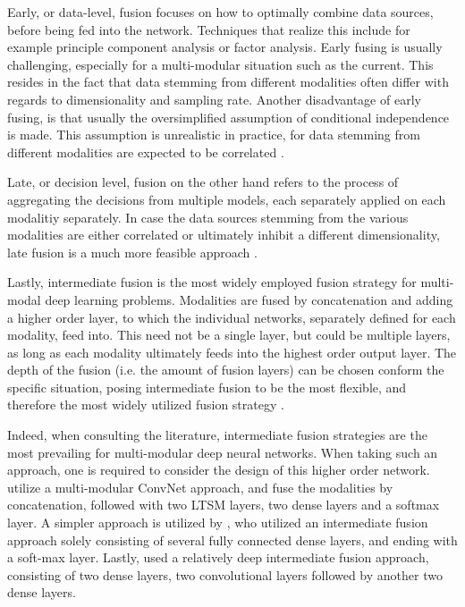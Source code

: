 \documentclass[12pt]{article}
\begin{document}
Early, or data-level, fusion focuses on how to optimally combine data sources, before being fed into the network. Techniques that realize this include for example principle component analysis or factor analysis. Early fusing is usually challenging, especially for a multi-modular situation such as the current. This resides in the fact that data stemming from different modalities often differ with regards to dimensionality and sampling rate. Another disadvantage of early fusing, is that usually the oversimplified assumption of conditional independence is made. This assumption is unrealistic in practice, for data stemming from different modalities are expected to be correlated \cite{ramachandram2017deep}. 

Late, or decision level, fusion on the other hand refers to the process of aggregating the decisions from multiple models, each separately applied on each modalitiy separately. In case the data sources stemming from the various modalities are either correlated or ultimately inhibit a different dimensionality, late fusion is a much more feasible approach \cite{ramachandram2017deep}.

Lastly, intermediate fusion is the most widely employed fusion strategy for multi-modal deep learning problems. Modalities are fused by concatenation and adding a higher order layer, to which the individual networks, separately defined for each modality, feed into. This need not be a single layer, but could be multiple layers, as long as each modality ultimately feeds into the highest order output layer. The depth of the fusion (i.e. the amount of fusion layers) can be chosen conform the specific situation, posing intermediate fusion to be the most flexible, and therefore the most widely utilized fusion strategy \cite{ramachandram2017deep}.

Indeed, when consulting the literature, intermediate fusion strategies are the most prevailing for multi-modular deep neural networks. When taking such an approach, one is required to consider the design of this higher order network.  utilize a multi-modular ConvNet approach, and fuse the modalities by concatenation, followed with two LTSM layers, two dense layers and a softmax layer. A simpler approach is utilized by	, who utilized an intermediate fusion approach solely consisting of several fully connected dense layers, and ending with a soft-max layer. Lastly,  used a relatively deep intermediate fusion approach, consisting of two dense layers, two convolutional layers followed by another two dense layers.  
\end{document}
